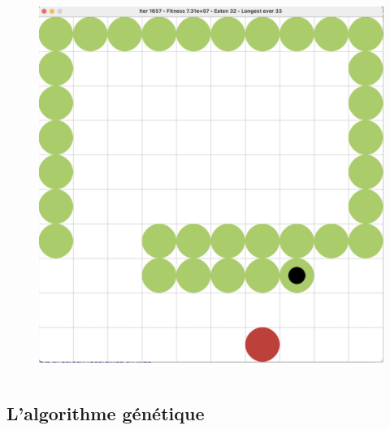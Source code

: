 \documentclass[10pt]{beamer}
\begin{document}
\begin{frame}
\begin{columns}[T]
\begin{column}{0.25\textwidth}
\begin{figure}
\vspace{-0.5cm}\hspace{-0.55cm}
\includegraphics[width=1.2\textwidth]{snake_game.png}
\end{figure}


\end{column}
\end{columns}
\end{frame}

\subsection{L'algorithme génétique}
\end{document}
